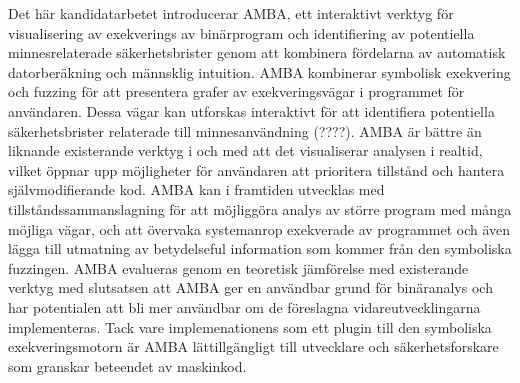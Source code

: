 Det här kandidatarbetet introducerar AMBA, ett interaktivt verktyg för
visualisering av exekverings av binärprogram och identifiering av
potentiella minnesrelaterade säkerhetsbrister genom att kombinera
fördelarna av automatisk datorberäkning och männsklig intuition.  AMBA
kombinerar symbolisk exekvering och fuzzing för att presentera grafer
av exekveringsvägar i programmet för användaren. Dessa vägar kan
utforskas interaktivt för att identifiera potentiella säkerhetsbrister
relaterade till minnesanvändning (????). AMBA är bättre än liknande
existerande verktyg i och med att det visualiserar analysen i realtid,
vilket öppnar upp möjligheter för användaren att prioritera tillstånd
och hantera självmodifierande kod. AMBA kan i framtiden utvecklas med
tillståndssammanslagning för att möjliggöra analys av större program
med många möjliga vägar, och att övervaka systemanrop exekverade av
programmet och även lägga till utmatning av betydelseful information
som kommer från den symboliska fuzzingen. AMBA evalueras genom en
teoretisk jämförelse med existerande verktyg med slutsatsen att AMBA
ger en användbar grund för binäranalys och har potentialen att bli mer
användbar om de föreslagna vidareutvecklingarna implementeras.  Tack
vare implemenationens som ett plugin till den symboliska
exekveringsmotorn \stoe{} är AMBA lättillgängligt till utvecklare och
säkerhetsforskare som granskar beteendet av maskinkod.
